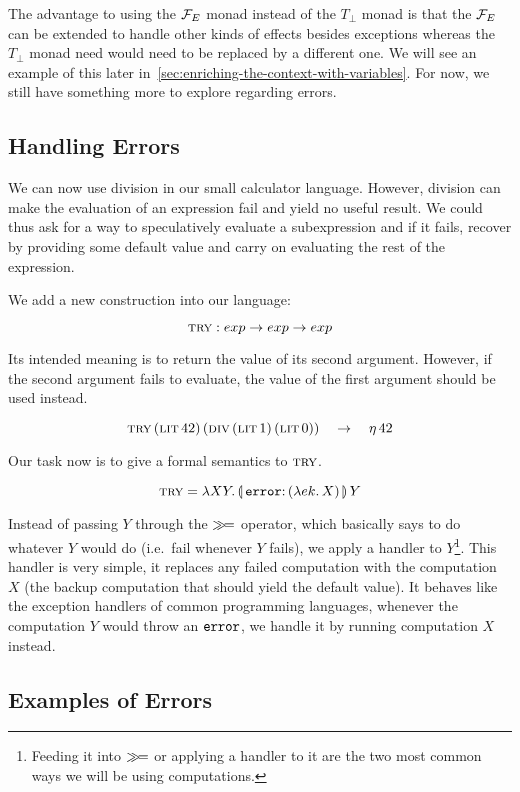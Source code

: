 The advantage to using the $\mathcal{F}_E$ monad instead of the $T_\bot$ monad is
that the $\mathcal{F}_E$ can be extended to handle other kinds of effects besides
exceptions whereas the $T_\bot$ monad need would need to be replaced by a
different one. We will see an example of this later
in~\ref{sec:enriching-the-context-with-variables}. For now, we still have
something more to explore regarding errors.

\subsection{Handling Errors}

We can now use division in our small calculator language. However, division
can make the evaluation of an expression fail and yield no useful
result. We could thus ask for a way to speculatively evaluate a
subexpression and if it fails, recover by providing some default value and
carry on evaluating the rest of the expression.

We add a new construction into our language:

$$
\textsc{try} : exp \to exp \to exp
$$

Its intended meaning is to return the value of its second
argument. However, if the second argument fails to evaluate, the value of
the first argument should be used instead.

$$
\textsc{try}\,(\textsc{lit}\,42)\,(\textsc{div}\,(\textsc{lit}\,1)\,(\textsc{lit}\,0))
\quad \to \quad \eta\,42
$$

Our task now is to give a formal semantics to $\textsc{try}$.

$$
\trye = \lam{X Y}{\ap{\banana{\onto{\op{error}}{(\lam{e k}{X})}}}{Y}}
$$

Instead of passing $Y$ through the $\mathbin{\gg\!=}$ operator, which basically says
to do whatever $Y$ would do (i.e.\ fail whenever $Y$ fails), we apply a
handler to $Y$\footnote{Feeding it into $\mathbin{\gg\!=}$ or applying a handler to
  it are the two most common ways we will be using computations.}. This
handler is very simple, it replaces any failed computation with the
computation $X$ (the backup computation that should yield the default
value). It behaves like the exception handlers of common programming
languages, whenever the computation $Y$ would throw an $\mathtt{error}$, we
handle it by running computation $X$ instead.

\subsection{Examples of Errors}

